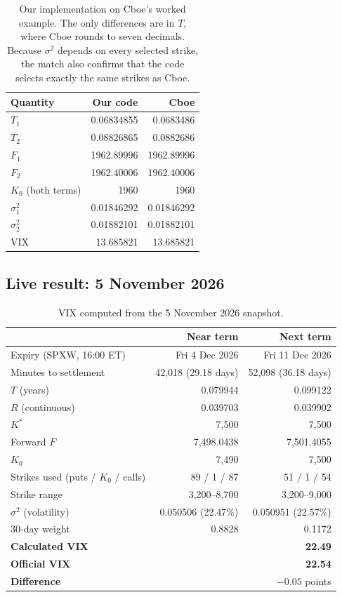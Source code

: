 \documentclass[12pt]{article}
\begin{document}
\begin{table}[H]
\centering
\small
\begin{tabular}{@{}lrr@{}}
\toprule
\textbf{Quantity} & \textbf{Our code} & \textbf{Cboe}\\
\midrule
$T_1$ & 0.06834855 & 0.0683486\\
$T_2$ & 0.08826865 & 0.0882686\\
$F_1$ & 1962.89996 & 1962.89996\\
$F_2$ & 1962.40006 & 1962.40006\\
$K_0$ (both terms) & 1960 & 1960\\
$\sigma_1^2$ & 0.01846292 & 0.01846292\\
$\sigma_2^2$ & 0.01882101 & 0.01882101\\
VIX & 13.685821 & 13.685821\\
\bottomrule
\end{tabular}
\caption{Our implementation on Cboe's worked example. The only differences are in $T$, where Cboe rounds to seven decimals. Because $\sigma^2$ depends on every selected strike, the match also confirms that the code selects exactly the same strikes as Cboe.}
\label{tab:cboe}
\end{table}

\subsection{Live result: 5 November 2026}
\label{sec:live}

\begin{table}[H]
\centering
\small
\begin{tabular}{@{}lrr@{}}
\toprule
 & \textbf{Near term} & \textbf{Next term}\\
\midrule
Expiry (SPXW, 16:00 ET) & Fri 4 Dec 2026 & Fri 11 Dec 2026\\
Minutes to settlement & 42,018 (29.18 days) & 52,098 (36.18 days)\\
$T$ (years) & 0.079944 & 0.099122\\
$R$ (continuous) & 0.039703 & 0.039902\\
$K^*$ & 7,500 & 7,500\\
Forward $F$ & 7,498.0438 & 7,501.4055\\
$K_0$ & 7,490 & 7,500\\
Strikes used (puts / $K_0$ / calls) & 89 / 1 / 87 & 51 / 1 / 54\\
Strike range & 3,200--8,700 & 3,200--9,000\\
$\sigma^2$ (volatility) & 0.050506 (22.47\%) & 0.050951 (22.57\%)\\
30-day weight & 0.8828 & 0.1172\\
\midrule
\textbf{Calculated VIX} & \multicolumn{2}{r}{\textbf{22.49}}\\
\textbf{Official VIX} & \multicolumn{2}{r}{\textbf{22.54}}\\
\textbf{Difference} & \multicolumn{2}{r}{$-0.05$ points}\\
\bottomrule
\end{tabular}
\caption{VIX computed from the 5 November 2026 snapshot.}
\label{tab:live}
\end{table}
\end{document}
